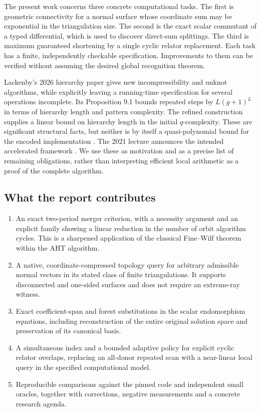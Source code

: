 \documentclass[11pt]{article}
\theoremstyle{definition}
\begin{document}
The present work concerns three concrete computational tasks. The first is
geometric connectivity for a normal surface whose coordinate sum may be
exponential in the triangulation size. The second is the exact scalar
commutant of a typed differential, which is used to discover direct-sum
splittings. The third is maximum guaranteed shortening by a single cyclic
relator replacement. Each task has a finite, independently checkable
specification. Improvements to them can be verified without assuming the
desired global recognition theorem.

Lackenby's 2026 hierarchy paper gives new incompressibility and unknot
algorithms, while explicitly leaving a running-time specification for
several operations incomplete. Its Proposition 9.1 bounds repeated steps
by $L(g+1)^L$ in terms of hierarchy length and pattern complexity. The
refined construction supplies a linear bound on hierarchy length in the
initial $q$-complexity. These are significant structural facts, but neither
is by itself a quasi-polynomial bound for the encoded implementation
\cite{lackenby2026}. The 2021 lecture announces the intended accelerated
framework \cite{lackenbytalk}. We use these as motivation and as a precise
list of remaining obligations, rather than interpreting efficient local
arithmetic as a proof of the complete algorithm.

\subsection{What the report contributes}

\begin{enumerate}
\item An exact two-period merger criterion, with a necessity argument and
an explicit family showing a linear reduction in the number of orbit
algorithm cycles. This is a sharpened application of the classical
Fine--Wilf theorem within the AHT algorithm.
\item A native, coordinate-compressed topology query for arbitrary
admissible normal vectors in its stated class of finite triangulations.
It supports disconnected and one-sided surfaces and does not require an
extreme-ray witness.
\item Exact coefficient-span and forest substitutions in the scalar
endomorphism equations, including reconstruction of the entire original
solution space and preservation of its canonical basis.
\item A simultaneous index and a bounded adaptive policy for explicit
cyclic relator overlaps, replacing an all-donor repeated scan with a
near-linear local query in the specified computational model.
\item Reproducible comparisons against the pinned code and independent
small oracles, together with corrections, negative measurements and a
concrete research agenda.
\end{enumerate}
\end{document}
